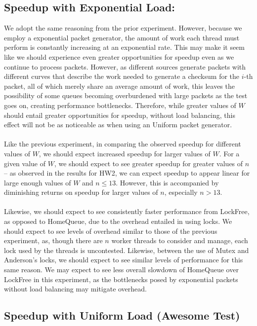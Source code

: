 \documentclass[]{article}
\begin{document}
\subsection{Speedup with Exponential Load:}
We adopt the same reasoning from the prior experiment. However, because we employ a exponential packet generator, the amount of work each thread must perform is constantly increasing at an exponential rate. This may make it seem like we should experience even greater opportunities for speedup even as we continue to process packets. However, as different sources generate packets with different curves that describe the work needed to generate a checksum for the $i$-th packet, all of which merely share an average amount of work, this leaves the possibility of some queues becoming overburdened with large packets as the test goes on, creating performance bottlenecks. Therefore, while greater values of $W$ should entail greater opportunities for speedup, without load balancing, this effect will not be as noticeable as when using an Uniform packet generator.
\\\\
Like the previous experiment, in comparing the observed speedup for different values of $W$, we should expect increased speedup for larger values of $W$. For a given value of $W$, we should expect to see greater speedup for greater values of $n$ -- as observed in the results for HW2, we can expect speedup to appear linear for large enough values of $W$ and $n \leq 13$. However, this is accompanied by diminishing returns on speedup for larger values of $n$, especially $n > 13$.
\\\\
Likewise, we should expect to see consistently faster performance from LockFree, as opposed to HomeQueue, due to the overhead entailed in using locks. We should expect to see levels of overhead similar to those of the previous experiment, as, though there are $n$ worker threads to consider and manage, each lock used by the threads is uncontested. Likewise, between the use of Mutex and Anderson's locks, we should expect to see similar levels of performance for this same reason. We may expect to see less overall slowdown of HomeQueue over LockFree in this experiment, as the bottlenecks posed by exponential packets without load balancing may mitigate overhead.


\subsection{Speedup with Uniform Load (Awesome Test)}
\end{document}
